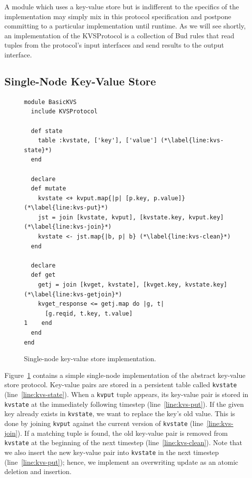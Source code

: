 A module which uses a key-value store but is indifferent to the specifics of the
implementation may simply mix in this protocol specification and postpone
committing to a particular implementation until runtime. As we will see shortly,
an implementation of the KVSProtocol is a collection of Bud rules that read
tuples from the protocol's input interfaces and send results to the output
interface.

\subsection{Single-Node Key-Value Store}
\label{sec:simple-kvs}
\begin{figure}[t]
\begin{scriptsize}
\begin{lstlisting}
module BasicKVS
  include KVSProtocol

  def state
    table :kvstate, ['key'], ['value'] (*\label{line:kvs-state}*)
  end

  declare
  def mutate
    kvstate <+ kvput.map{|p| [p.key, p.value]} (*\label{line:kvs-put}*)
    jst = join [kvstate, kvput], [kvstate.key, kvput.key] (*\label{line:kvs-join}*)
    kvstate <- jst.map{|b, p| b} (*\label{line:kvs-clean}*)
  end

  declare
  def get
    getj = join [kvget, kvstate], [kvget.key, kvstate.key] (*\label{line:kvs-getjoin}*)
    kvget_response <= getj.map do |g, t|
      [g.reqid, t.key, t.value]
1    end
  end
end
\end{lstlisting}
\centering
\vspace{-10pt}
\caption{Single-node key-value store implementation.}
\label{fig:kvs-impl}
\end{scriptsize}
\vspace{-2pt}
\end{figure}

Figure~\ref{fig:kvs-impl} contains a simple single-node implementation of the
abstract key-value store protocol. Key-value pairs are stored in a persistent
table called \texttt{kvstate} (line~\ref{line:kvs-state}). When a \texttt{kvput}
tuple appears, its key-value pair is stored in \texttt{kvstate} at the immediately
following timestep (line~\ref{line:kvs-put}).  If the given key already exists in
\texttt{kvstate}, we want to replace the key's old value. This is done by
joining \texttt{kvput} against the current version of \texttt{kvstate}
(line~\ref{line:kvs-join}). If a matching tuple is found, the old key-value pair
is removed from \texttt{kvstate} at the beginning of the next timestep
(line~\ref{line:kvs-clean}). Note that we also insert the new key-value pair
into \texttt{kvstate} in the next timestep (line~\ref{line:kvs-put});
hence, we implement an overwriting update as an atomic deletion and insertion.

